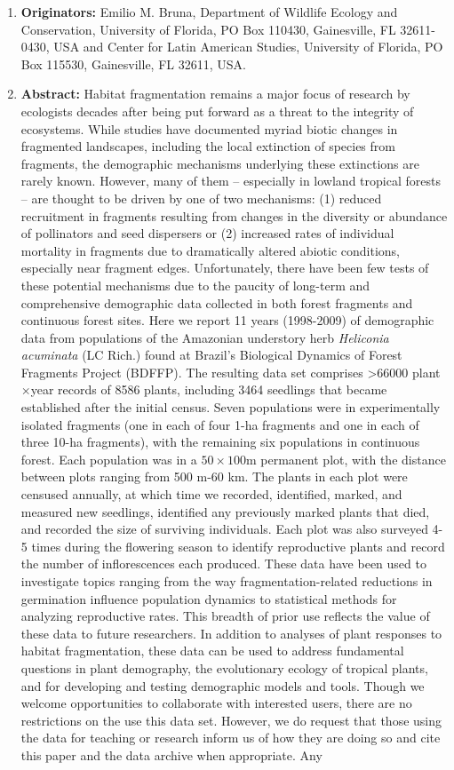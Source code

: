 \documentclass[
  man, donotrepeattitle,floatsintext]{apa6}
\begin{document}
\begin{enumerate}
\def\labelenumi{\arabic{enumi}.}
\item
  \textbf{Originators:} Emilio M. Bruna, Department of Wildlife Ecology and Conservation, University of Florida, PO Box 110430, Gainesville, FL 32611-0430, USA and Center for Latin American Studies, University of Florida, PO Box 115530, Gainesville, FL 32611, USA.
\item
  \textbf{Abstract:} Habitat fragmentation remains a major focus of research by ecologists decades after being put forward as a threat to the integrity of ecosystems. While studies have documented myriad biotic changes in fragmented landscapes, including the local extinction of species from fragments, the demographic mechanisms underlying these extinctions are rarely known. However, many of them -- especially in lowland tropical forests -- are thought to be driven by one of two mechanisms: (1) reduced recruitment in fragments resulting from changes in the diversity or abundance of pollinators and seed dispersers or (2) increased rates of individual mortality in fragments due to dramatically altered abiotic conditions, especially near fragment edges. Unfortunately, there have been few tests of these potential mechanisms due to the paucity of long-term and comprehensive demographic data collected in both forest fragments and continuous forest sites. Here we report 11 years (1998-2009) of demographic data from populations of the Amazonian understory herb \emph{Heliconia acuminata} (LC Rich.) found at Brazil's Biological Dynamics of Forest Fragments Project (BDFFP). The resulting data set comprises \textgreater66000 plant\(\times\)year records of 8586 plants, including 3464 seedlings that became established after the initial census. Seven populations were in experimentally isolated fragments (one in each of four 1-ha fragments and one in each of three 10-ha fragments), with the remaining six populations in continuous forest. Each population was in a \(50\times100\)m permanent plot, with the distance between plots ranging from 500 m-60 km. The plants in each plot were censused annually, at which time we recorded, identified, marked, and measured new seedlings, identified any previously marked plants that died, and recorded the size of surviving individuals. Each plot was also surveyed 4-5 times during the flowering season to identify reproductive plants and record the number of inflorescences each produced. These data have been used to investigate topics ranging from the way fragmentation-related reductions in germination influence population dynamics to statistical methods for analyzing reproductive rates. This breadth of prior use reflects the value of these data to future researchers. In addition to analyses of plant responses to habitat fragmentation, these data can be used to address fundamental questions in plant demography, the evolutionary ecology of tropical plants, and for developing and testing demographic models and tools. Though we welcome opportunities to collaborate with interested users, there are no restrictions on the use this data set. However, we do request that those using the data for teaching or research inform us of how they are doing so and cite this paper and the data archive when appropriate. Any 
\end{enumerate}
\end{document}
